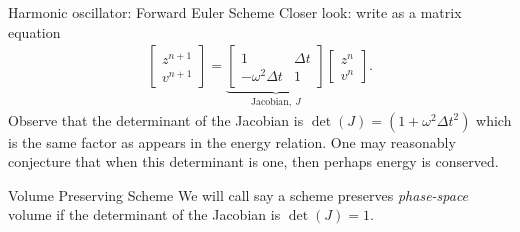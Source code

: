 \documentclass[aspectratio=43]{beamer}
\begin{document}
\begin{frame}{Harmonic oscillator: Forward Euler Scheme}
  Closer look: write as a matrix equation
  \begin{align*}
    \left[
    \begin{matrix}
      z^{n+1} \\
      v^{n+1}
    \end{matrix}
    \right]
    =
    \underbrace{
    \left[
    \begin{matrix}
      1 & \Delta t \\
      -\omega^2 \Delta t & 1
    \end{matrix}
    \right]
    }_{\textrm{Jacobian},\ J}
    \left[
    \begin{matrix}
      z^{n} \\
      v^{n}
    \end{matrix}
    \right].                        
  \end{align*}
  Observe that the determinant of the Jacobian is
  $\det(J)=(1+\omega^2\Delta t^2)$ which is the same factor as appears
  in the energy relation. One may reasonably conjecture that when this
  determinant is one, then perhaps energy is conserved.

  \begin{block}{Volume Preserving Scheme}
    We will call say a scheme preserves \emph{phase-space} volume
    if the determinant of the Jacobian is $\det(J)=1$.
  \end{block}

\end{frame}
\end{document}
